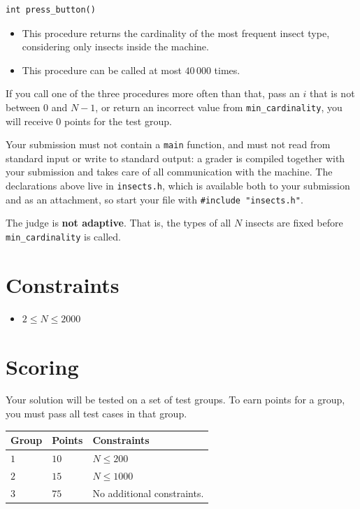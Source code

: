 \begin{verbatim}
int press_button()
\end{verbatim}

\begin{itemize}
  \item This procedure returns the cardinality of the most frequent insect type, considering only
  insects inside the machine.
  \item This procedure can be called at most $40\,000$ times.
\end{itemize}

If you call one of the three procedures more often than that, pass an $i$ that is not between $0$ and
$N-1$, or return an incorrect value from \texttt{min\_cardinality}, you will receive $0$ points for
the test group.

Your submission must not contain a \texttt{main} function, and must not read from standard input or
write to standard output: a grader is compiled together with your submission and takes care of all
communication with the machine. The declarations above live in \texttt{insects.h}, which is available
both to your submission and as an attachment, so start your file with
\texttt{\#include "insects.h"}.

The judge is \textbf{not adaptive}. That is, the types of all $N$ insects are fixed before
\texttt{min\_cardinality} is called.

\section*{Constraints}
\begin{itemize}
  \item $2 \leq N \leq 2000$
\end{itemize}

\section*{Scoring}
Your solution will be tested on a set of test groups.
To earn points for a group, you must pass all test cases in that group.

\noindent
\begin{tabular}{| l | l | p{12cm} |}
  \hline
  \textbf{Group} & \textbf{Points} & \textbf{Constraints} \\ \hline
  $1$ & $10$ & $N \leq 200$ \\ \hline
  $2$ & $15$ & $N \leq 1000$ \\ \hline
  $3$ & $75$ & No additional constraints. \\ \hline
\end{tabular}

